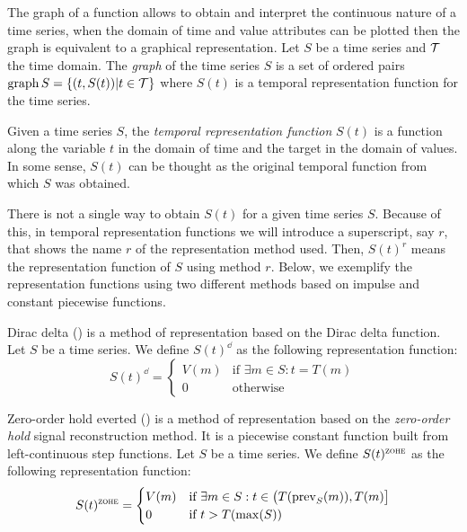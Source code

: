 The graph of a function allows to obtain and interpret the
continuous nature of a time series, when the domain of time and value
attributes can be plotted then the graph is equivalent to a graphical
representation.  
%
Let $S$ be a time series and $\cal{T}$ the time domain. The \emph{graph} of
the time series $S$ is a set of ordered pairs $\operatorname*{graph} S
=\{(t,S(t))|t\in \cal{T}\}$ where $S(t)$ is a temporal representation
function for the time series.
%

Given a time series $S$, the \emph{temporal representation function}
$S(t)$ is a function along the variable $t$ in the domain of
time and the target in the domain of values.
%
In some sense, $S(t)$ can be thought as the original temporal function
from which $S$ was obtained.
%

There is not a single way to obtain $S(t)$ for a given time series
$S$. Because of this, in temporal representation functions we will
introduce a superscript, say $r$, that shows the name $r$ of the
representation method used. Then, $S(t)^r$ means the representation
function of $S$ using method $r$. Below, we exemplify the
representation functions using two different methods based on impulse
and constant piecewise functions.


\begin{definition} 
  Dirac delta (\dd) is a method of representation based on the Dirac
  delta function. Let $S$ be a time series. We define $S(t)^\dd$ as
  the following \dd{} representation function:
  \[
  S(t)^\dd
  =  \begin{cases}
          V(m) & \text{if } \exists m\in S:t=T(m) \\
          0    & \text{otherwise}
  \end{cases}
  \]
\end{definition}

\begin{definition}
  Zero-order hold everted (\zohe{}) is a method of representation
  based on the \emph{zero-order hold} signal reconstruction method. It
  is a piecewise constant function built from left-continuous step
  functions.  Let $S$ be a time series. We define $S(t)^\zohe$ as the
  following representation function:
  \[
  S(t)^\zohe 
  = \begin{cases}
    V(m) & \text{if } \exists m\in S: t\in \big(T(\prev_S(m)),T(m)\big]\\
    0    & \text{if } t > T(\max(S)) 
  \end{cases}
  \]
\end{definition}




